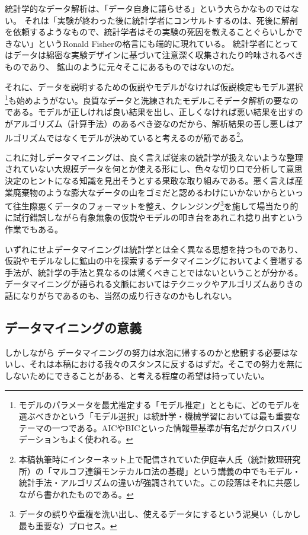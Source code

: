 統計学的なデータ解析は、「データ自身に語らせる」という大らかなものではない。
それは「実験が終わった後に統計学者にコンサルトするのは、死後に解剖を依頼するようなもので、統計学者はその実験の死因を教えることぐらいしかできない」というRonald Fisherの格言にも端的に現れている。
統計学者にとってはデータは綿密な実験デザインに基づいて注意深く収集されたり吟味されるべきものであり、
鉱山のように元々そこにあるものではないのだ。

それに、データを説明するための仮説やモデルがなければ仮説検定もモデル選択\footnote{モデルのパラメータを最尤推定する「モデル推定」とともに、どのモデルを選ぶべきかという「モデル選択」は統計学・機械学習においては最も重要なテーマの一つである。AICやBICといった情報量基準が有名だがクロスバリデーションもよく使われる。}も始めようがない。良質なデータと洗練されたモデルこそデータ解析の要なのである。モデルが正しければ良い結果を出し、正しくなければ悪い結果を出すのがアルゴリズム（計算手法）のあるべき姿なのだから、解析結果の善し悪しはアルゴリズムではなくモデルが決めていると考えるのが筋である\footnote{本稿執筆時にインターネット上で配信されていた伊庭幸人氏（統計数理研究所）の「マルコフ連鎖モンテカルロ法の基礎」という講義の中でもモデル・統計手法・アルゴリズムの違いが強調されていた。この段落はそれに共感しながら書かれたものである。}。

これに対しデータマイニングは、良く言えば従来の統計学が扱えないような整理されていない大規模データを何とか使える形にし、色々な切り口で分析して意思決定のヒントになる知識を見出そうとする果敢な取り組みである。悪く言えば産業廃棄物のような膨大なデータの山をゴミだと認めるわけにいかないからといって往生際悪くデータのフォーマットを整え、クレンジング\footnote{データの誤りや重複を洗い出し、使えるデータにするという泥臭い（しかし最も重要な）プロセス。}を施して場当たり的に試行錯誤しながら有象無象の仮説やモデルの叩き台をあれこれ捻り出すという作業でもある。

いずれにせよデータマイニングは統計学とは全く異なる思想を持つものであり、仮説やモデルなしに鉱山の中を探索するデータマイニングにおいてよく登場する手法が、統計学の手法と異なるのは驚くべきことではないということが分かる。データマイニングが語られる文脈においてはテクニックやアルゴリズムありきの話になりがちであるのも、当然の成り行きなのかもしれない。

\subsection{データマイニングの意義}
しかしながら
データマイニングの努力は水泡に帰するのかと悲観する必要はないし、それは本稿における我々のスタンスに反するはずだ。そこでの努力を無にしないためにできることがある、と考える程度の希望は持っていたい。

